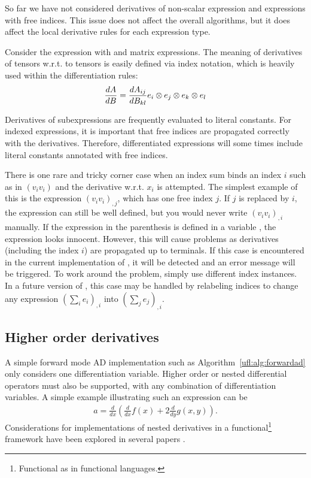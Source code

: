 So far we have not considered derivatives of non-scalar expression and
expressions with free indices.  This issue does not affect the overall
algorithms, but it does affect the local derivative rules for each
expression type.

Consider the expression  with  and  matrix
expressions.  The meaning of derivatives of tensors w.r.t. to tensors
is easily defined via index notation, which is heavily used within the
differentiation rules:
\begin{align}
\frac{d{A}}{d{B}} = \frac{dA_{ij}}{d B_{kl}} {e}_i\otimes{e}_j\otimes{e}_k\otimes{e}_l
\end{align}

Derivatives of subexpressions are frequently evaluated to literal
constants.  For indexed expressions, it is important that free indices
are propagated correctly with the derivatives.  Therefore, differentiated
expressions will some times include literal constants annotated with
free indices.

There is one rare and tricky corner case when an index sum binds an index
$i$ such as in $(v_i v_i)$ and the derivative w.r.t. $x_i$ is attempted.
The simplest example of this is the expression $(v_i v_i)_{,j}$, which has
one free index $j$.  If $j$ is replaced by $i$, the expression can still
be well defined, but you would never write $(v_i v_i)_{,i}$ manually.
If the expression in the parenthesis is defined in a variable , the expression  looks innocent. However,
this will cause problems as derivatives (including the index $i$) are
propagated up to terminals.  If this case is encountered in the current
implementation of \ufl{}, it will be detected and an error message will
be triggered.  To work around the problem, simply use different index
instances.  In a future version of \ufl{}, this case may be handled by
relabeling indices to change any expression $(\sum_i e_i)_{,i}$ into
$(\sum_j e_j)_{,i}$.

\subsection{Higher order derivatives}

A simple forward mode AD implementation such as
Algorithm~\ref{ufl:alg:forwardad} only considers one differentiation
variable.  Higher order or nested differential operators must also be
supported, with any combination of differentiation variables.  A simple
example illustrating such an expression can be
\begin{align} \label{ufl:eq:nested}
a = \frac{d}{dx}\left( \frac{d}{dx} f(x) + 2 \frac{d}{dy} g(x,y) \right) .
\end{align}
Considerations for implementations of nested derivatives
in a functional\footnote{Functional as in functional
languages.} framework have been explored in several papers
\citep{Karczmarczuk2001,PearlmutterSiskind2007,SiskindPearlmutter2008}.

